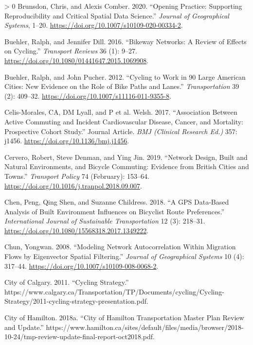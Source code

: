 \documentclass[smallextended]{svjour3}       %
\newlength{\cslhangindent}
\newenvironment{CSLReferences}[3] %
 {%
  \setlength{\parindent}{0pt}
  \ifodd #1 \everypar{\setlength{\hangindent}{\cslhangindent}}\ignorespaces\fi
  \ifnum #2 > 0
  \setlength{\parskip}{#2\baselineskip}
  \fi
 }%
 {}
\begin{document}
\begin{CSLReferences}{1}{0}
\leavevmode\hypertarget{ref-brunsdon2020opening}{}%
Brunsdon, Chris, and Alexis Comber. 2020. {``Opening Practice:
Supporting Reproducibility and Critical Spatial Data Science.''}
\emph{Journal of Geographical Systems}, 1--20.
\url{https://doi.org/10.1007/s10109-020-00334-2}.

\leavevmode\hypertarget{ref-Buehler2016}{}%
Buehler, Ralph, and Jennifer Dill. 2016. {``Bikeway Networks: {A} Review
of Effects on Cycling.''} \emph{Transport Reviews} 36 (1): 9--27.
\url{https://doi.org/10.1080/01441647.2015.1069908}.

\leavevmode\hypertarget{ref-Buehler2012}{}%
Buehler, Ralph, and John Pucher. 2012. {``Cycling to Work in 90 Large
{American} Cities: New Evidence on the Role of Bike Paths and Lanes.''}
\emph{Transportation} 39 (2): 409--32.
\url{https://doi.org/10.1007/s11116-011-9355-8}.

\leavevmode\hypertarget{ref-Celis2017}{}%
Celis-Morales, CA, DM Lyall, and P et al. Welsh. 2017. {``Association
Between Active Commuting and Incident Cardiovascular Disease, Cancer,
and Mortality: Prospective Cohort Study.''} Journal Article. \emph{BMJ
(Clinical Research Ed.)} 357: j1456.
\url{https://doi.org/10.1136/bmj.j1456}.

\leavevmode\hypertarget{ref-Cervero2019}{}%
Cervero, Robert, Steve Denman, and Ying Jin. 2019. {``Network Design,
Built and Natural Environments, and Bicycle Commuting: {Evidence} from
{British} Cities and Towns.''} \emph{Transport Policy} 74 (February):
153--64. \url{https://doi.org/10.1016/j.tranpol.2018.09.007}.

\leavevmode\hypertarget{ref-Chen2018}{}%
Chen, Peng, Qing Shen, and Suzanne Childress. 2018. {``A {GPS}
Data-Based Analysis of Built Environment Influences on Bicyclist Route
Preferences.''} \emph{International Journal of Sustainable
Transportation} 12 (3): 218--31.
\url{https://doi.org/10.1080/15568318.2017.1349222}.

\leavevmode\hypertarget{ref-Chun2008}{}%
Chun, Yongwan. 2008. {``Modeling Network Autocorrelation Within
Migration Flows by Eigenvector Spatial Filtering.''} \emph{Journal of
Geographical Systems} 10 (4): 317--44.
\url{https://doi.org/10.1007/s10109-008-0068-2}.

\leavevmode\hypertarget{ref-Calgary2011}{}%
City of Calgary. 2011. {``Cycling Strategy.''}
https://www.calgary.ca/Transportation/TP/Documents/cycling/Cycling-Strategy/2011-cycling-strategy-presentation.pdf.

\leavevmode\hypertarget{ref-Tmp2018}{}%
City of Hamilton. 2018a. {``City of Hamilton Transportation Master Plan
Review and Update.''}
https://www.hamilton.ca/sites/default/files/media/browser/2018-10-24/tmp-review-update-final-report-oct2018.pdf.


\end{CSLReferences}
\end{document}
